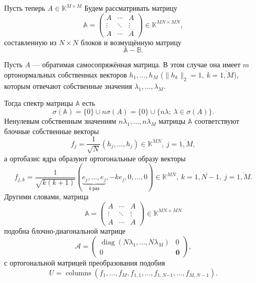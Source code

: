 Пусть теперь \( A\in \mathbb{K}^{M\times M} \)
Будем рассматривать матрицу
\[
    \mathbb{A} =
    \begin{pmatrix}
        A      & \cdots & A \\
        \vdots & \ddots & \vdots \\
        A      & \cdots & A
    \end{pmatrix}
    \in \mathbb{K}^{MN{\times}MN},
    \]
    составленную из \( N\times N \) блоков
    и возмущённую матрицу
\[
    \mathbb{A} - \mathbb{B}.
    \]

\begin{ksvlem}
    Пусть \( A \) --- обратимая самосопряжённая матрица.
    В этом случае она имеет \( m \) ортонормальных
    собственных векторов \( h_1, \ldots, h_M \)
    (\( \|h_k\|_2=1,\ k{=}\overline{1,M} \)),
    которым отвечают собственные значения \( \lambda_1, \ldots, \lambda_M \).

    Тогда спектр матрицы \( \mathbb{A} \) есть
    \[
        \sigma(\mathbb{A}) = \{0\} \cup n\sigma(A)
        = \{ 0 \} \cup \{ n\lambda;\ \lambda\in\sigma(A) \}.
        \]
    Ненулевым собственным значениям \( n\lambda_1, \ldots, n\lambda_M \)
    матрицы \( \mathbb{A} \)
    соответствуют блочные собственные векторы
    \[
        f_j = \frac{1}{\sqrt{N}}(h_j, \ldots, h_j)\in\mathbb{K}^{MN},
        \ j{=}\overline{1,M},
       \]
    а ортобазис ядра образуют ортогональные образу
    векторы
    \[
        f_{j,k} =
        \frac{1}{\sqrt{k(k+1)}}
        (\underbrace{e_j,\ldots,e_j}_{k\ \text{раз}}, -ke_j, 0, \ldots, 0)\in\mathbb{K}^{MN},
        \ k{=}\overline{1,N-1},
        \ j{=}\overline{1,M}.
        \]
    Другими словами, матрица
    \[
        \mathbb{A} = 
        \begin{pmatrix}
            A      & \cdots & A \\
            \vdots & \ddots & \vdots \\
            A      & \cdots & A
        \end{pmatrix}
        \in\mathbb{K}^{MN{\times}MN}
        \]
    подобна блочно-диагональной матрице
    \[
        \mathcal{A} =
        \left(\begin{array}{c|c}
            \operatorname{diag}(N\lambda_1,\ldots,N\lambda_M) & 0 \\ \hline
            0 & \mathbf{0}
        \end{array}\right),
        \]
    с ортогональной матрицей преобразования подобия
    \[
        U = \operatorname{columns}
        \left(f_1, \ldots, f_M, f_{1,1}, \ldots, f_{1,N{-1}}, \ldots, f_{M,N{-}1}\right).
        \]
\end{ksvlem}

